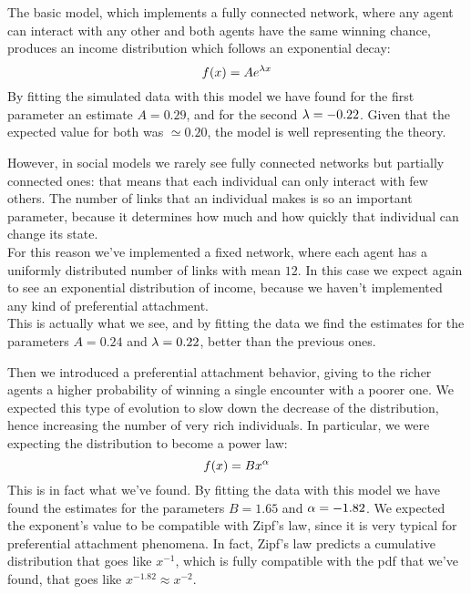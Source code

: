 The basic model, which implements a fully connected network, where any agent can interact with any other and both agents have the same winning chance, produces an income distribution which follows an exponential decay:
$$
	f(x) = Ae^{\lambda x}
$$
By fitting the simulated data with this model we have found for the first parameter an estimate $A = 0.29$, and for the second $\lambda = -0.22$.
Given that the expected value for both was $\simeq 0.20$, the model is well representing the theory.

However, in social models we rarely see fully connected networks but partially connected ones: that means that each individual can only interact with few others.
The number of links that an individual makes is so an important parameter, because it determines how much and how quickly that individual can change its state. \\
For this reason we've implemented a fixed network, where each agent has a uniformly distributed number of links with mean $12$.
In this case we expect again to see an exponential distribution of income, because we haven't implemented any kind of preferential attachment. \\
This is actually what we see, and by fitting the data we find the estimates for the parameters $A = 0.24$ and $\lambda = 0.22$, better than the previous ones.


Then we introduced a preferential attachment behavior, giving to the richer agents a higher probability of winning a single encounter with a poorer one. We expected this type of evolution to slow down the decrease of the distribution, hence increasing the number of very rich individuals. In particular, we were expecting the distribution to become a power law:
$$
	f(x) = Bx^{\alpha}
$$
This is in fact what we've found. By fitting the data with this model we have found the estimates for the parameters $B = 1.65$ and $\alpha = -1.82$.
We expected the exponent's value to be compatible with Zipf's law, since it is very typical for preferential attachment phenomena.
In fact, Zipf's law predicts a cumulative distribution that goes like $x^{-1}$, which is fully compatible with the pdf that we've found, that goes like $x^{-1.82} \approx x^{-2}$.


